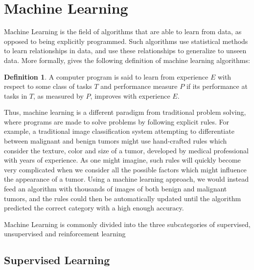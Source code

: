 \documentclass[UKenglish]{uiomasterthesis} %
\theoremstyle{definition}
\newtheorem*{definition}{Definition}
\begin{document}
\section{Machine Learning}

Machine Learning is the field of algorithms that are able to learn from data, as opposed to being explicitly programmed. Such algorithms use statistical methods to learn relationships in data, and use these relationships to generalize to unseen data. More formally, \cite{mitchell} gives the following definition of machine learning algorithms:

\begin{definition}
A computer program is said to learn from experience $E$ with respect to some class of tasks $T$ and performance measure $P$ if its performance at tasks in $T$, as measured by $P$, improves with experience $E$.
\end{definition}

Thus, machine learning is a different paradigm from traditional problem solving, where programs are made to solve problems by following explicit rules. For example, a traditional image classification system attempting to differentiate between malignant and benign tumors might use hand-crafted rules which consider the texture, color and size of a tumor, developed by medical professional with years of experience. As one might imagine, such rules will quickly become very complicated when we consider all the possible factors which might influence the appearance of a tumor. Using a machine learning approach, we would instead feed an algorithm with thousands of images of both benign and malignant tumors, and the rules could then be automatically updated until the algorithm predicted the correct category with a high enough accuracy.

Machine Learning is commonly divided into the three subcategories of supervised, unsupervised and reinforcement learning


\subsection{Supervised Learning}
\end{document}
